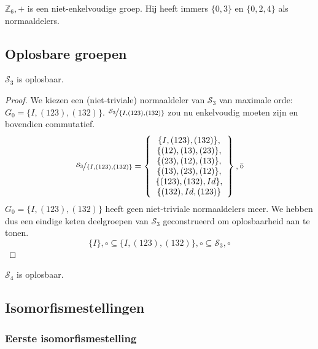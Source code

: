\documentclass[main.tex]{subfiles}
\begin{document}
\begin{vb}
  $\mathbb{Z}_{6},+$ is een niet-enkelvoudige groep.
  Hij heeft immers $\{0,3\}$ en $\{0,2,4\}$ als normaaldelers.
\end{vb}

\subsection{Oplosbare groepen}
\label{sec:oplosbare-groepen}

\begin{vb}
  $\mathcal{S}_{3}$ is oplosbaar.

  \begin{proof}
    We kiezen een (niet-triviale) normaaldeler van $\mathcal{S}_{3}$ van maximale orde: $G_{0}=\{I,(123),(132)\}$.
    $\nicefrac{\mathcal{S}_{3}}{\{I,(123),(132)\}}$ zou nu enkelvoudig moeten zijn en bovendien commutatief.
    \[
    \nicefrac{\mathcal{S}_{3}}{\{I,(123),(132)\}} =
    \left\{
      \begin{array}{c}
        \{I,(123),(132)\},\\ 
        \{(12), (13), (23)\},\\
        \{ (23), (12), (13)\},\\
        \{ (13), (23), (12)\},\\
        \{ (123), (132), Id\},\\
        \{ (132), Id, (123)\}
      \end{array}
    \right\},\bar{\circ}
    \]
    $G_{0}=\{I,(123),(132)\}$ heeft geen niet-triviale normaaldelers meer.
    We hebben dus een eindige keten deelgroepen van $\mathcal{S}_{3}$ geconstrueerd om oplosbaarheid aan te tonen.
    \[ \{ I\},\circ \subseteq \{I,(123),(132)\},\circ \subseteq \mathcal{S}_{3},\circ \]
  \end{proof}
\end{vb}

\begin{vb}
  $\mathcal{S}_{4}$ is oplosbaar.
\end{vb}

\subsection{Isomorfismestellingen}

\subsubsection{Eerste isomorfismestelling}
\end{document}

